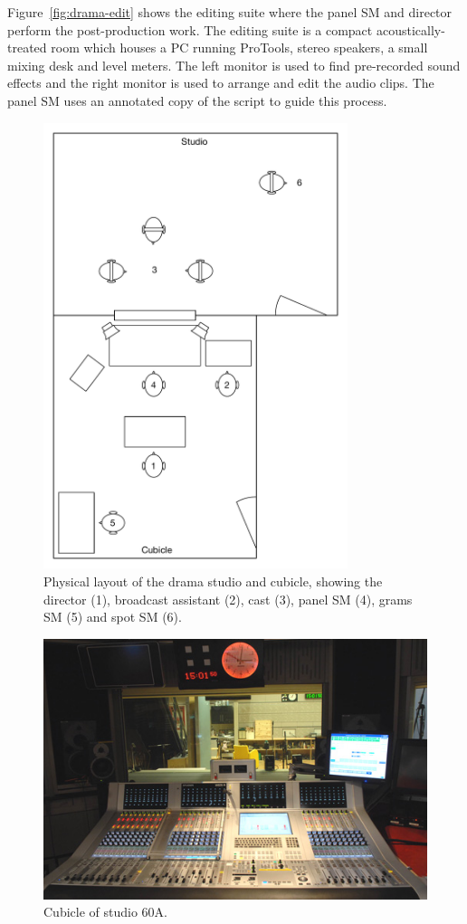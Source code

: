 Figure~\ref{fig:drama-edit} shows the editing suite where the panel SM and director perform the post-production work.
The editing suite is a compact acoustically-treated room which houses a PC running ProTools, stereo speakers, a small
mixing desk and level meters.  The left monitor is used to find pre-recorded sound effects and the right monitor is
used to arrange and edit the audio clips. The panel SM uses an annotated copy of the script to guide this process.

\begin{figure}
  \centering
  \includegraphics[width=3.5in]{figs/drama-layout.pdf}
  \caption{Physical layout of the drama studio and cubicle, showing the director (1), broadcast assistant (2), cast
  (3), panel SM (4), grams SM (5) and spot SM (6).}
  \label{fig:drama-layout}
\end{figure}

\begin{figure}
  \centering
  \includegraphics[width=\columnwidth]{figs/60a.jpg}
  \caption{Cubicle of studio 60A.}
  \label{fig:drama-studio}
\end{figure}


